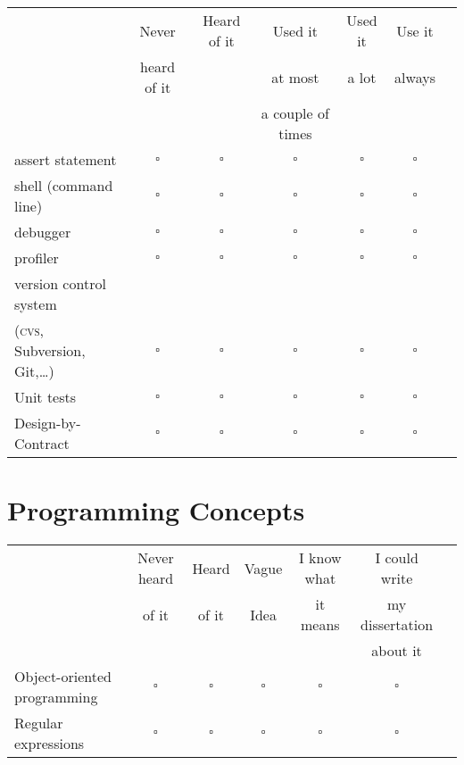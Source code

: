 \documentclass[article,twoside]{memoir}
\newcommand*{\bigO}{\mathcal{O}}
\newcommand*{\checkbox}{$\square$}
\def\th#1{#1}
\begin{document}
\begin{tabular}{lcccccc}
 \toprule
 & \th{Never}       & \th{Heard of it} & \th{Used it}           & \th{Used it} & \th{Use it}\\
 & \th{heard of it} & \th{}            & \th{at most}           & \th{a lot}   & \th{always}\\
 & \th{}            & \th{}            & \th{a couple of times} & \th{}        & \th{}\\
 \midrule
assert statement           &\checkbox &\checkbox &\checkbox &\checkbox &\checkbox \\
shell (command line)       &\checkbox &\checkbox &\checkbox &\checkbox &\checkbox \\
debugger                   &\checkbox &\checkbox &\checkbox &\checkbox &\checkbox \\
profiler                   &\checkbox &\checkbox &\checkbox &\checkbox &\checkbox \\
version control system \\
(\textsc{cvs}, 
Subversion, Git,\dots)     &\checkbox &\checkbox &\checkbox &\checkbox &\checkbox \\
Unit tests                 &\checkbox &\checkbox &\checkbox &\checkbox &\checkbox \\
Design-by-Contract         &\checkbox &\checkbox &\checkbox &\checkbox &\checkbox \\
\end{tabular}

\section{Programming Concepts}
\begin{tabular}{lcccccc}
 \toprule
 & Never heard  & Heard & Vague & I know what & I could write    \\
 & of it        & of it & Idea  & it means    & my dissertation  \\
 &              &       &       &             &    about it      \\
 \midrule
Object-oriented programming            &\checkbox &\checkbox &\checkbox &\checkbox &\checkbox \\
Regular expressions                    &\checkbox &\checkbox &\checkbox &\checkbox &\checkbox \\
\end{tabular}
\end{document}
